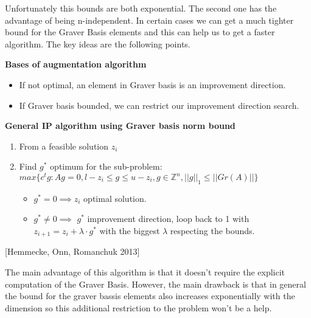 Unfortunately this bounds are both exponential. The second one has the advantage of being n-independent. In certain cases we can get a much tighter bound for the Graver Basis elements and this can help us to get a faster algorithm. The key ideas are the following points.

\textbf{Bases of augmentation algorithm}
\begin{itemize}
    \item If not optimal, an element in Graver basis is an improvement direction.
    \item If Graver basis bounded, we can restrict our improvement direction search.
\end{itemize}

\textbf{General IP algorithm using Graver basis norm bound}
\begin{enumerate}
    \item From a feasible solution $z_i$
    \item Find $g^*$ optimum for the sub-problem: \vspace{4pt}\\
          $max\{c^tg : Ag = 0, l-z_i \leq g \leq u-z_i, g \in \mathbb{Z}^n, ||g||_1 \leq ||Gr(A)|| \}$ \vspace{4pt}
    \begin{itemize}
        \item $g^* = 0 \implies z_i$ optimal solution.
        \item $g^* \neq 0 \implies$ $g^*$ improvement direction, loop back to 1 with $z_{i+1} = z_i + \lambda \cdot g^*$ with the biggest $\lambda$ respecting the bounds.
    \end{itemize}
\end{enumerate}
\hspace{15pt} [Hemmecke, Onn, Romanchuk 2013]


The main advantage of this algorithm is that it doesn't require the explicit computation of the Graver Basis. However, the main drawback is that in general the bound for the graver bassis elements also increases exponentially with the dimension so this additional restriction to the problem won't be a help.
